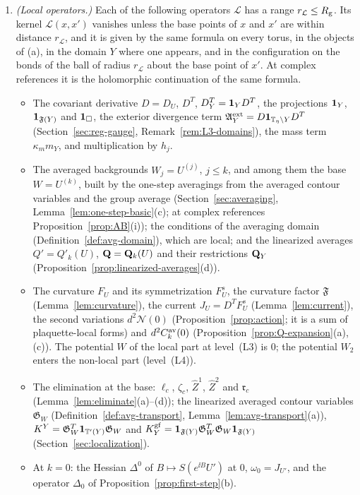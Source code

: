 \begin{lemma}
\begin{enumerate}[label=(\alph*)]
\item \emph{(Local operators.)} Each of the following operators $\mathcal L$ has a range $r_{\mathcal L}\le R_{\rm g}$. Its kernel $\mathcal L(x,x')$ vanishes unless the base points of $x$ and $x'$ are within distance $r_{\mathcal L}$, and it is given by the same formula on every torus, in the objects of (a), in the domain $Y$ where one appears, and in the configuration on the bonds of the ball of radius $r_{\mathcal L}$ about the base point of $x'$. At complex references it is the holomorphic continuation of the same formula.
  \begin{itemize}
  \item The covariant derivative $D=D_U$, $D^T$, $D^T_Y=\mathbf 1_YD^T$, the projections $\mathbf 1_Y$, $\mathbf 1_{\mathfrak F(Y)}$ and $\mathbf 1_\Box$, the exterior divergence term $\mathfrak A^{\rm ext}_Y=D\mathbf 1_{\mathbb T_\eta\setminus Y}D^T$ (Section~\ref{sec:reg-gauge}, Remark~\ref{rem:L3-domains}), the mass term $\kappa_mm_Y$, and multiplication by $h_j$.
  \item The averaged backgrounds $W_j=U^{(j)}$, $j\le k$, and among them the base $W=U^{(k)}$, built by the one-step averagings from the averaged contour variables and the group average (Section~\ref{sec:averaging}, Lemma~\ref{lem:one-step-basic}(c); at complex references Proposition~\ref{prop:AB}(i)); the conditions of the averaging domain (Definition~\ref{def:avg-domain}), which are local; and the linearized averages $Q'=Q'_k(U)$, $\mathbf Q=\mathbf Q_k(U)$ and their restrictions $\mathbf Q_Y$ (Proposition~\ref{prop:linearized-averages}(d)).
  \item The curvature $F_U$ and its symmetrization $F^s_U$, the curvature factor $\mathfrak F$ (Lemma~\ref{lem:curvature}), the current $J_U=D^TF^s_U$ (Lemma~\ref{lem:current}), the second variations $d^2\mathcal N(0)$ (Proposition~\ref{prop:action}; it is a sum of plaquette-local forms) and $d^2C^{\rm av}_k(0)$ (Proposition~\ref{prop:Q-expansion}(a),(c)). The potential $W$ of the local part at level~(L3) is $0$; the potential $W_2$ enters the non-local part (level~(L4)).
  \item The elimination at the base: $\ell_c$, $\zeta_c$, $\hat Z^1$, $\hat Z^2$ and $\mathfrak r_c$ (Lemma~\ref{lem:eliminate}(a)--(d)); the linearized averaged contour variables $\mathfrak G_W$ (Definition~\ref{def:avg-transport}, Lemma~\ref{lem:avg-transport}(a)), $K^Y=\mathfrak G_W^T\mathbf 1_{\mathbb T'(Y)}\mathfrak G_W$ and $K^{\rm gf}_Y=\mathbf 1_{\mathfrak F(Y)}\mathfrak G_W^T\mathfrak G_W\mathbf 1_{\mathfrak F(Y)}$ (Section~\ref{sec:localization}).
  \item At $k=0$: the Hessian $\Delta^0$ of $B\mapsto S(e^{\ii B}U')$ at $0$, $\omega_0=J_{U'}$, and the operator $\Delta_0$ of Proposition~\ref{prop:first-step}(b).

\end{itemize}
\end{enumerate}
\end{lemma}
